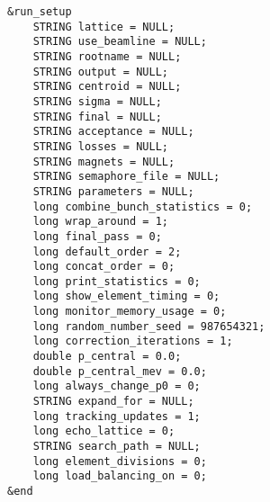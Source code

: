 \documentclass[11pt]{article}
\begin{document}
\begin{verbatim}
&run_setup
    STRING lattice = NULL;
    STRING use_beamline = NULL;
    STRING rootname = NULL;
    STRING output = NULL;
    STRING centroid = NULL;
    STRING sigma = NULL;
    STRING final = NULL;
    STRING acceptance = NULL;
    STRING losses = NULL;
    STRING magnets = NULL;
    STRING semaphore_file = NULL;
    STRING parameters = NULL;
    long combine_bunch_statistics = 0;
    long wrap_around = 1;
    long final_pass = 0;
    long default_order = 2;
    long concat_order = 0;
    long print_statistics = 0;
    long show_element_timing = 0;
    long monitor_memory_usage = 0;
    long random_number_seed = 987654321;
    long correction_iterations = 1;
    double p_central = 0.0;
    double p_central_mev = 0.0;
    long always_change_p0 = 0;
    STRING expand_for = NULL; 
    long tracking_updates = 1;
    long echo_lattice = 0;
    STRING search_path = NULL;
    long element_divisions = 0;
    long load_balancing_on = 0;
&end
\end{verbatim}
\end{document}
